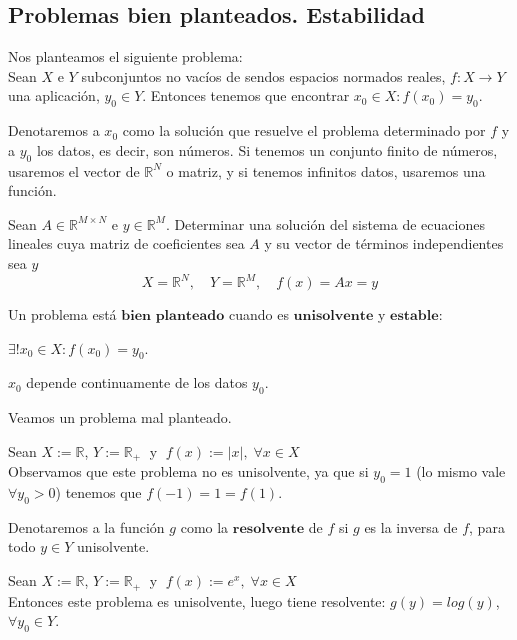 \subsection{Problemas bien planteados. Estabilidad}
Nos planteamos el siguiente problema:\\
Sean $X$ e $Y$ subconjuntos no vacíos de sendos espacios normados reales, $f: X \rightarrow Y$ una aplicación, $y_0 \in Y$. Entonces tenemos que encontrar $x_0 \in X : f(x_0) = y_0$.

Denotaremos a $x_0$ como la solución que resuelve el problema determinado por $f$ y a $y_0$ los datos, es decir, son números. Si tenemos un conjunto finito de números, usaremos el vector de $\mathbb{R}^N$ o matriz, y si tenemos infinitos datos, usaremos una función.

\begin{ejemplo}
Sean $A \in \mathbb{R}^{M \times N}$ e $y \in \mathbb{R}^M$. Determinar una solución del sistema de ecuaciones lineales cuya matriz de coeficientes sea $A$ y su vector de términos independientes sea $y$
$$X = \mathbb{R}^N, \quad Y = \mathbb{R}^M, \quad f(x) = Ax = y$$
\end{ejemplo}

\begin{ndef}
Un problema está $\textbf{bien planteado}$ cuando es $\textbf{unisolvente}$ y $\textbf{estable}$:
	\begin{nlist}
	\item $\exists ! x_0 \in X : f(x_0) = y_0$.
	\item $x_0$ depende continuamente de los datos $y_0$.
	\end{nlist}
\end{ndef}

\begin{ejemplo}
Veamos un problema mal planteado.

Sean $X := \mathbb{R}$, $Y := \mathbb{R}_+ \;$ y $\; f(x) := \vert x \vert , \; \forall x \in X$\\
Observamos que este problema no es unisolvente, ya que si $y_0 = 1$ (lo mismo vale $\forall y_0 > 0$) tenemos que $f(-1) = 1 = f(1)$.
\end{ejemplo}

\begin{ndef}[Resolvente]
Denotaremos a la función $g$ como la $\textbf{resolvente}$ de $f$ si $g$ es la inversa de $f$, para todo $y \in Y$ unisolvente.
\end{ndef}

\begin{ejemplo}
Sean $X := \mathbb{R}$, $Y := \mathbb{R}_+ \;$ y $\; f(x) := e^x , \; \forall x \in X$\\
Entonces este problema es unisolvente, luego tiene resolvente: $g(y) = log(y)$, $\forall y_0 \in Y$.
\end{ejemplo}

